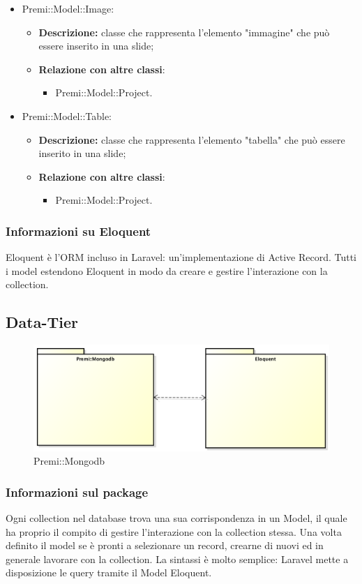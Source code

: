 \begin{itemize}
		\item Premi::Model::Image:
		\begin{itemize}
			\item \textbf{Descrizione:} classe che rappresenta l'elemento "immagine" che può essere inserito in una \gls{slide};
			\item \textbf{Relazione con altre classi}:
			\begin{itemize}
				\item Premi::Model::Project.
			\end{itemize}
		\end{itemize}
		
		\item Premi::Model::Table:
		\begin{itemize}
			\item \textbf{Descrizione:} classe che rappresenta l'elemento "tabella" che può essere inserito in una \gls{slide};
			\item \textbf{Relazione con altre classi}:
			\begin{itemize}
				\item Premi::Model::Project.
			\end{itemize}
		\end{itemize}
	\end{itemize}
	
\subsubsection*{Informazioni su Eloquent}
Eloquent è l'ORM incluso in Laravel: un'implementazione di Active Record. Tutti i model estendono  Eloquent in modo da creare e gestire l'interazione con la collection.

\subsection{Data-Tier}
\begin{figure}[h]
\centering
\includegraphics[width=0.7\linewidth]{img/premi_mongodb}
\caption[Premi::Mongodb]{Premi::Mongodb}
\label{fig:premi_mongodb}
\end{figure}
\subsubsection*{Informazioni sul package}
Ogni collection nel database trova una sua corrispondenza in un Model, il quale ha proprio il compito di gestire l'interazione con la collection stessa. Una volta definito il model se è pronti a selezionare un record, crearne di nuovi ed in generale lavorare con la collection. La sintassi è molto semplice: Laravel mette a disposizione le query tramite il Model Eloquent.
